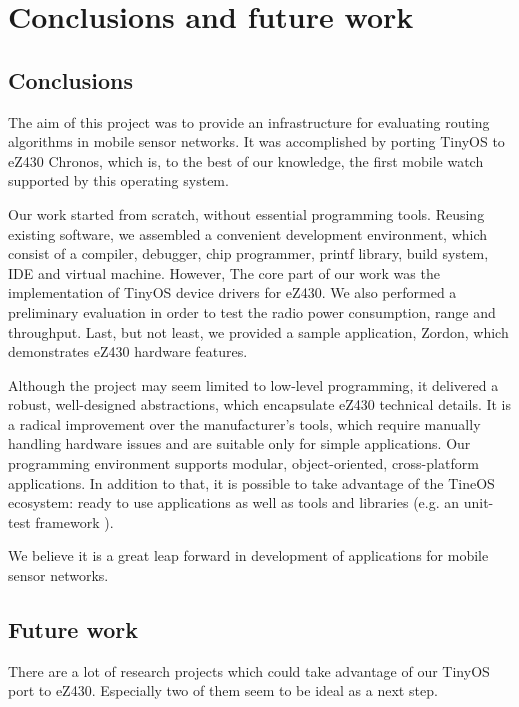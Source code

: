 \chapter{Conclusions and future work}
\label{ch:conclusions}

\section{Conclusions}


The aim of this project was to provide an infrastructure for evaluating routing algorithms in mobile sensor networks.
It was accomplished by porting TinyOS to eZ430 Chronos, which is, to the best of our knowledge, the first mobile watch supported by this operating system.

Our work started from scratch, without essential programming tools.
Reusing existing software, we assembled a convenient development environment, which consist of a compiler, debugger, chip programmer, printf library, build system, IDE and virtual machine.
However, The core part of our work was the implementation of TinyOS device drivers for eZ430.
We also performed a preliminary evaluation in order to test the radio power consumption, range and throughput.
Last, but not least, we provided a sample application, Zordon, which demonstrates eZ430 hardware features.

Although the project may seem limited to low-level programming, it delivered a robust, well-designed abstractions, which encapsulate eZ430 technical details.
It is a radical improvement over the manufacturer's tools, which require manually handling hardware issues and are suitable only for simple applications.
Our programming environment supports modular, object-oriented, cross-platform applications.
In addition to that, it is possible to take advantage of the TineOS ecosystem:
ready to use applications as well as tools and libraries (e.g. an unit-test framework \cite{TOSMock}).

We believe it is a great leap forward in development of applications for mobile sensor networks.


\section{Future work}
There are a lot of research projects which could take advantage of our TinyOS port to eZ430.
Especially two of them seem to be ideal as a next step.

